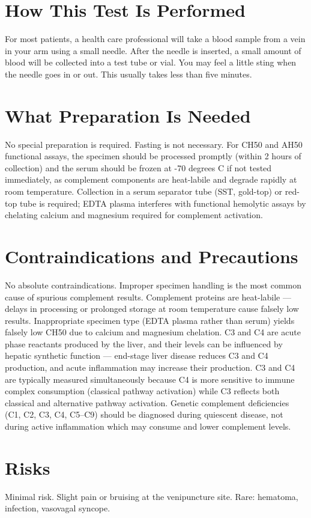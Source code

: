 \section*{How This Test Is Performed}
For most patients, a health care professional will take a blood sample from a vein in your arm using a small needle. After the needle is inserted, a small amount of blood will be collected into a test tube or vial. You may feel a little sting when the needle goes in or out. This usually takes less than five minutes.

\section*{What Preparation Is Needed}
No special preparation is required. Fasting is not necessary. For CH50 and AH50 functional assays, the specimen should be processed promptly (within 2 hours of collection) and the serum should be frozen at -70 degrees C if not tested immediately, as complement components are heat-labile and degrade rapidly at room temperature. Collection in a serum separator tube (SST, gold-top) or red-top tube is required; EDTA plasma interferes with functional hemolytic assays by chelating calcium and magnesium required for complement activation.

\section*{Contraindications and Precautions}
No absolute contraindications. Improper specimen handling is the most common cause of spurious complement results. Complement proteins are heat-labile --- delays in processing or prolonged storage at room temperature cause falsely low results. Inappropriate specimen type (EDTA plasma rather than serum) yields falsely low CH50 due to calcium and magnesium chelation. C3 and C4 are acute phase reactants produced by the liver, and their levels can be influenced by hepatic synthetic function --- end-stage liver disease reduces C3 and C4 production, and acute inflammation may increase their production. C3 and C4 are typically measured simultaneously because C4 is more sensitive to immune complex consumption (classical pathway activation) while C3 reflects both classical and alternative pathway activation. Genetic complement deficiencies (C1, C2, C3, C4, C5--C9) should be diagnosed during quiescent disease, not during active inflammation which may consume and lower complement levels.

\section*{Risks}
Minimal risk. Slight pain or bruising at the venipuncture site. Rare: hematoma, infection, vasovagal syncope.

